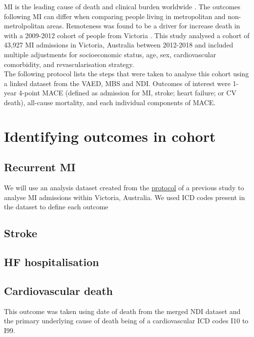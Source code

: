 \documentclass[11pt]{article}
\begin{document}
MI is the leading cause of death and clinical burden worldwide \cite{virani2020}. The outcomes following MI can differ when comparing people living in metropolitan and non-metrolpolitan areas. Remoteness was found to be a driver for increase death in with a 2009-2012 cohort of people from Victoria \cite{jacobs2018}. This study analysed a cohort of 43,927 MI admissions in Victoria, Australia between 2012-2018 and included multiple adjustments for socioeconomic status, age, sex, cardiovascular comorbidity, and revascularisation strategy.\\
The following protocol lists the steps that were taken to analyse this cohort using a linked dataset from the VAED, MBS and NDI. Outcomes of interest were 1-year 4-point MACE (defined as admission for MI, stroke; heart failure; or CV death), all-cause mortality, and each individual components of MACE. 

\pagebreak

\section{Identifying outcomes in cohort}
\subsection{Recurrent MI}
We will use an analysis dataset created from the \color{blue} \href{https://github.com/cardiopharmnerd/medsremote}{protocol} \color{black} of a previous study to analyse MI admissions within Victoria, Australia. We used ICD codes present in the dataset to define each outcome
\color{violet} 	
\begin{stlog}\end{stlog}
\color{black}
\subsection{Stroke}
\color{violet}
\begin{stlog}\end{stlog}
\color{black}
\subsection{HF hospitalisation}
\color{violet}
\begin{stlog}\end{stlog}
\color{black}
\subsection{Cardiovascular death}
This outcome was taken using date of death from the merged NDI dataset and the primary underlying cause of death being of a cardiovascular ICD codes I10 to I99.
\color{violet}
\begin{stlog}\end{stlog}
\color{black}
\end{document}
